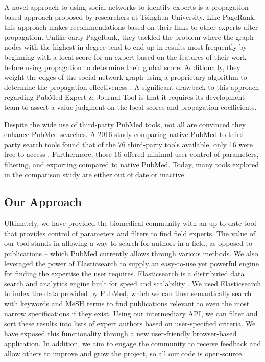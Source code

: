 A novel approach to using social networks to identify experts is a propagation-based approach proposed by researchers at Tsinghua University. Like PageRank, this approach makes recommendations based on their links to other experts after propagation. Unlike early PageRank, they tackled the problem where the graph nodes with the highest in-degree tend to end up in results most frequently by beginning with a local score for an expert based on the features of their work before using propagation to determine their global score. Additionally, they weight the edges of the social network graph using a proprietary algorithm to determine the propagation effectiveness \cite{ref-expert-social-network}. A significant drawback to this approach regarding PubMed Expert \& Journal Tool is that it requires its development team to assert a value judgment on the local scores and propagation coefficients. 

Despite the wide use of third-party PubMed tools, not all are convinced they enhance PubMed searches. A 2016 study comparing native PubMed to third-party search tools found that of the 76 third-party tools available, only 16 were free to access \cite{ref-pubmed-third-party}. Furthermore, those 16 offered minimal user control of parameters, filtering, and exporting compared to native PubMed. Today, many tools explored in the comparison study are either out of date or inactive. 

\subsection{Our Approach}

Ultimately, we have provided the biomedical community with an up-to-date tool that provides control of parameters and filters to find field experts. The value of our tool stands in allowing a way to search for authors in a field, as opposed to publications – which PubMed currently allows through various methods. We also leveraged the power of Elasticsearch to supply an easy-to-use yet powerful engine for finding the expertise the user requires. Elasticsearch is a distributed data search and analytics engine built for speed and scalability \cite{ref-elasticsearch}. We used Elasticsearch to index the data provided by PubMed, which we can then semantically search with keywords and MeSH terms to find publications relevant to even the most narrow specifications if they exist. Using our intermediary API, we can filter and sort these results into lists of expert authors based on user-specified criteria. We have exposed this functionality through a new user-friendly browser-based application. In addition, we aim to engage the community to receive feedback and allow others to improve and grow the project, so all our code is open-source. 